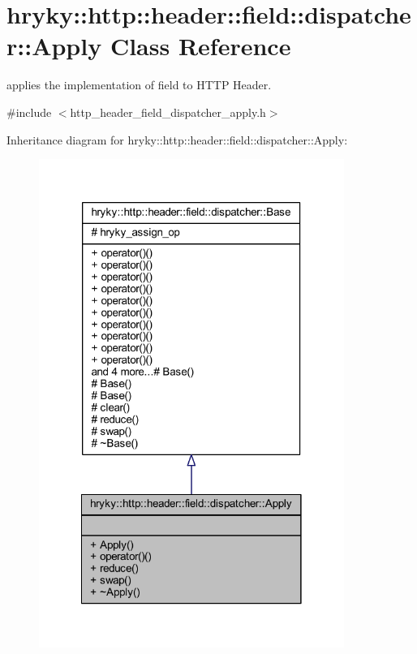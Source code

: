 \hypertarget{classhryky_1_1http_1_1header_1_1field_1_1dispatcher_1_1_apply}{\section{hryky\-:\-:http\-:\-:header\-:\-:field\-:\-:dispatcher\-:\-:Apply Class Reference}
\label{classhryky_1_1http_1_1header_1_1field_1_1dispatcher_1_1_apply}
}


applies the implementation of field to H\-T\-T\-P Header.  




{\ttfamily \#include $<$http\-\_\-header\-\_\-field\-\_\-dispatcher\-\_\-apply.\-h$>$}



Inheritance diagram for hryky\-:\-:http\-:\-:header\-:\-:field\-:\-:dispatcher\-:\-:Apply\-:
\nopagebreak
\begin{figure}[H]
\begin{center}
\leavevmode
\includegraphics[width=282pt]{classhryky_1_1http_1_1header_1_1field_1_1dispatcher_1_1_apply__inherit__graph}
\end{center}
\end{figure}
